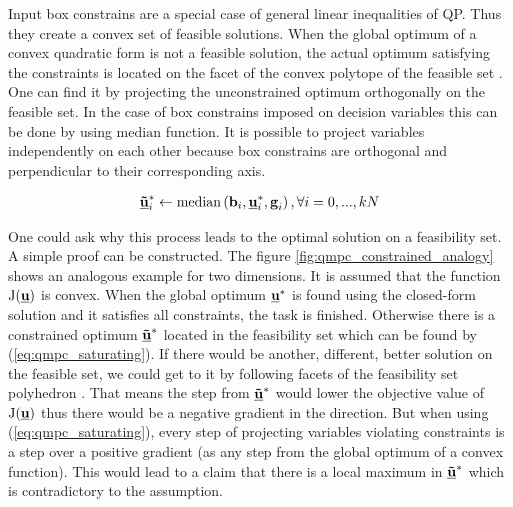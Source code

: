 Input box constrains are a special case of general linear inequalities of QP. Thus they create a convex set of feasible solutions. When the global optimum of a convex quadratic form is not a feasible solution, the actual optimum satisfying the constraints is located on the facet of the convex polytope of the feasible set \citep{boyd2004convex}. One can find it by projecting the unconstrained optimum orthogonally on the feasible set. In the case of box constrains imposed on decision variables this can be done by using $\mathrm{median}$ function. It is possible to project variables independently on each other because box constrains are orthogonal and perpendicular to their corresponding axis.

\begin{equation}
\begin{split}
\label{eq:qmpc_saturating}
\textbf{\underline{\~u}}^*_i \leftarrow \mathrm{median}\left(\textbf{b}_i, \textbf{\underline{u}}^*_i, \textbf{g}_i\right),  \forall i=0,...,kN
\end{split}
\end{equation}

\newcommand{\boundellipse}[3]%
{(#1) ellipse (#2 and #3)
}

One could ask why this process leads to the optimal solution on a feasibility set. A simple proof can be constructed. The figure \ref{fig:qmpc_constrained_analogy} shows an analogous example for two dimensions. It is assumed that the function $\mathrm{J}(\textbf{\underline{u}})$ is convex. When the global optimum $\textbf{\underline{u}}^*$ is found using the closed-form solution and it satisfies all constraints, the task is finished. Otherwise there is a constrained optimum $\textbf{\underline{\~u}}^*$ located in the feasibility set which can be found by (\ref{eq:qmpc_saturating}). If there would be another, different, better solution on the feasible set, we could get to it by following facets of the feasibility set polyhedron \citep{boyd2004convex}. That means the step from $\textbf{\underline{\~u}}^*$ would lower the objective value of $\mathrm{J}(\textbf{\underline{u}})$ thus there would be a negative gradient in the direction. But when using (\ref{eq:qmpc_saturating}), every step of projecting variables violating constraints is a step over a positive gradient (as any step from the global optimum of a convex function). This would lead to a claim that there is a local maximum in $\textbf{\underline{\~u}}^*$ which is contradictory to the assumption.

